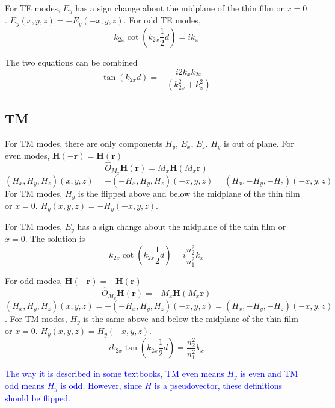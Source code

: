 \documentclass[12pt]{article}
\numberwithin{equation}{section}
\newcommand{\blue}[1]{\textcolor{blue}{#1}} %
\begin{document}
For TE modes, $E_y$ has a sign change about the midplane of the thin film or $x = 0$. 
$E_y (x, y, z) = -E_y (-x, y, z) $.
For odd TE modes,
\begin{equation}
\boxed{k_{2x} \cot (k_{2x} \frac{1}{2} d ) = i k_x}
\end{equation}

The two equations can be combined 
\begin{equation}
\tan (k_{2x} d )  = - \frac{ i 2 k_x k_{2x}}{( k_{2x}^2 + k_x^2 )} 
\end{equation}

\subsection{TM}
For TM modes, there are only components $H_y$, $E_x$, $E_z$.  $H_y$ is out of plane.  
For even modes, $\mathbf{H}(- \mathbf{r}) = \mathbf{H} ( \mathbf{r} )$
\begin{equation}
\hat{O}_{M_x} \mathbf{H} (\mathbf{r}) = M_x \mathbf{H} ( M_x \mathbf{r})
\end{equation}
$(H_x, H_y, H_z) (x, y, z) = -(-H_x, H_y, H_z) (-x, y, z) = (H_x, -H_y, -H_z) (-x, y, z)$
For TM modes, $H_y$ is the flipped above and below the midplane of the thin film or $x = 0$.  
$H_y (x, y, z) = -H_y (-x, y, z) $.

For TM modes, $E_y$ has a sign change about the midplane of the thin film or $x = 0$. 
The solution is 
\begin{equation}
\boxed{k_{2x} \cot (k_{2x} \frac{1}{2} d ) = i \frac{n_2^2}{n_1^2} k_x }
\end{equation}


For odd modes, $\mathbf{H}(- \mathbf{r}) = - \mathbf{H} ( \mathbf{r} )$
\begin{equation}
\hat{O}_{M_x} \mathbf{H} (\mathbf{r}) = - M_x \mathbf{H} ( M_x \mathbf{r})
\end{equation}
$(H_x, H_y, H_z) (x, y, z) = -(-H_x, H_y, H_z) (-x, y, z) = (H_x, -H_y, -H_z) (-x, y, z)$.
For TM modes, $H_y$ is the same above and below the midplane of the thin film or $x = 0$.  
$H_y (x, y, z) = H_y (-x, y, z) $.
\begin{equation}
\boxed{i k_{2x}\tan (k_{2x} \frac{1}{2} d ) = \frac{{n_2^2}}{n_1^2} k_x}
\end{equation}


\blue{The way it is described in some textbooks, TM even means $H_y$ is even and TM odd means $H_y$ is odd.  However, since $H$ is a pseudovector, 
these definitions should be flipped.}  
\end{document}
